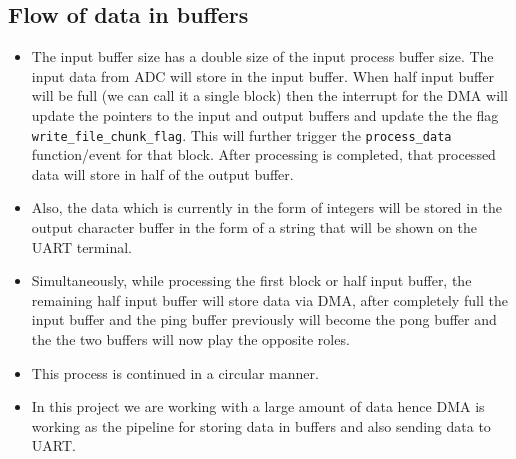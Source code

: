 \documentclass[11pt]{article}
\begin{document}
\subsection{Flow of data in buffers}
\label{sec:orgf002b05}

\begin{itemize}
\item The input buffer size has a double size of the input process buffer size. The input data from ADC will store in the input buffer. When half input buffer will be full (we can call it a single block) then the interrupt for the DMA will update the pointers to the input and output buffers and update the the flag \texttt{write\_file\_chunk\_flag}. This will further trigger the \texttt{process\_data} function/event for that block. After processing is completed, that processed data will store in half of the output buffer.
\item Also, the data which is currently in the form of integers will be stored in the output character buffer in the form of a string that will be shown on the UART terminal.
\item Simultaneously, while processing the first block or half input buffer, the remaining half input buffer will store data via DMA, after completely full the input buffer and the ping buffer previously will become the pong buffer and the the two buffers will now play the opposite roles.
\item This process is continued in a circular manner.
\item In this project we are working with a large amount of data hence DMA is working as the pipeline for storing data in buffers and also sending data to UART.
\end{itemize}
\end{document}
